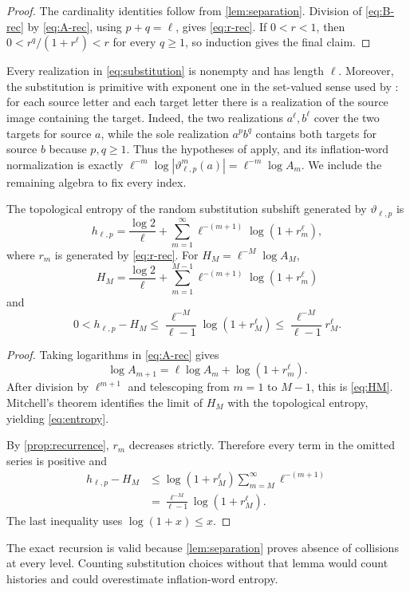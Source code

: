 \begin{proof}
The cardinality identities follow from \cref{lem:separation}.  Division of
\cref{eq:B-rec} by \cref{eq:A-rec}, using $p+q=\ell$, gives
\cref{eq:r-rec}.  If $0<r<1$, then
$0<r^q/(1+r^\ell)<r$ for every $q\ge1$, so induction gives the final claim.
\end{proof}

Every realization in \cref{eq:substitution} is nonempty and has length
$\ell$.  Moreover, the substitution is primitive with exponent one in the
set-valued sense used by \cite{Mitchell2024}: for each source letter and each
target letter there is a realization of the source image containing the
target.  Indeed, the two realizations $a^\ell,b^\ell$ cover the two targets
for source $a$, while the sole realization $a^pb^q$ contains both targets for
source $b$ because $p,q\ge1$.  Thus the hypotheses of
\cite[Theorem~4.1]{Mitchell2024} apply, and its inflation-word normalization
is exactly $\ell^{-m}\log|\vartheta_{\ell,p}^m(a)|=\ell^{-m}\log A_m$.
We include the remaining algebra to fix every index.

\begin{theorem}
\label{thm:entropy}
The topological entropy of the random substitution subshift generated by
$\vartheta_{\ell,p}$ is
\begin{equation}
 h_{\ell,p}=\frac{\log2}{\ell}
 +\sum_{m=1}^{\infty}\ell^{-(m+1)}\log(1+r_m^\ell),
 \label{eq:entropy}
\end{equation}
where $r_m$ is generated by \cref{eq:r-rec}.  For
$H_M=\ell^{-M}\log A_M$,
\begin{equation}
 H_M=\frac{\log2}{\ell}
 +\sum_{m=1}^{M-1}\ell^{-(m+1)}\log(1+r_m^\ell)
 \label{eq:HM}
\end{equation}
and
\begin{equation}
 0<h_{\ell,p}-H_M
 \le \frac{\ell^{-M}}{\ell-1}\log(1+r_M^\ell)
 \le\frac{\ell^{-M}}{\ell-1}r_M^\ell.
 \label{eq:tail-certificate}
\end{equation}
\end{theorem}

\begin{proof}
Taking logarithms in \cref{eq:A-rec} gives
\[
 \log A_{m+1}=\ell\log A_m+\log(1+r_m^\ell).
\]
After division by $\ell^{m+1}$ and telescoping from $m=1$ to $M-1$, this is
\cref{eq:HM}.  Mitchell's theorem identifies the limit of $H_M$ with the
topological entropy, yielding \cref{eq:entropy}.

By \cref{prop:recurrence}, $r_m$ decreases strictly.  Therefore every term
in the omitted series is positive and
\begin{align*}
 h_{\ell,p}-H_M
 &\le \log(1+r_M^\ell)
 \sum_{m=M}^{\infty}\ell^{-(m+1)}\\
 &=\frac{\ell^{-M}}{\ell-1}\log(1+r_M^\ell).
\end{align*}
The last inequality uses $\log(1+x)\le x$.
\end{proof}

\begin{remark}
The exact recursion is valid because \cref{lem:separation} proves absence of
collisions at every level.  Counting substitution choices without that lemma
would count histories and could overestimate inflation-word entropy.
\end{remark}
